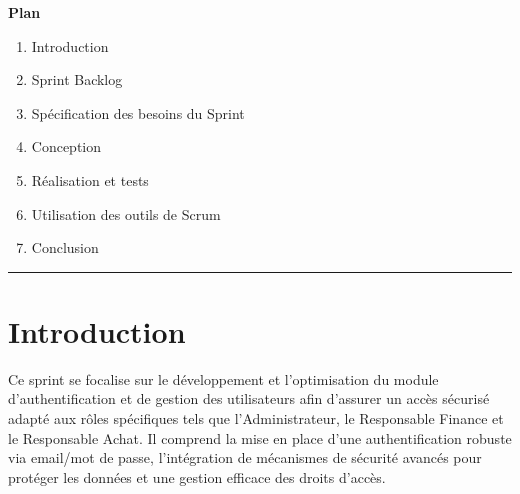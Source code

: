 \documentclass[a4paper,11pt]{report}
\begin{document}
\begin{center}
  {\huge\bfseries Plan}\\[0.5em]
\end{center}
\vspace{1em}

\begin{enumerate}[%
  label=\bfseries\Large\arabic*., 
  leftmargin=2cm, 
  itemsep=1em
]
  \item Introduction
  \item Sprint Backlog
  \item Spécification des besoins du Sprint
  \item Conception
  \item Réalisation et tests
  \item Utilisation des outils de Scrum
  \item Conclusion
\end{enumerate}

\vfill
\begin{center}
  \color{blue!60!black}\rule{0.6\textwidth}{0.8pt}
\end{center}

\newpage
\setcounter{section}{0}

\section{Introduction}

Ce sprint se focalise sur le développement et l’optimisation du module d’authentification et de gestion des utilisateurs afin d’assurer un accès sécurisé adapté aux rôles spécifiques tels que l’Administrateur, le Responsable Finance et le Responsable Achat. Il comprend la mise en place d’une authentification robuste via email/mot de passe, l’intégration de mécanismes de sécurité avancés pour protéger les données et une gestion efficace des droits d’accès.\\
\end{document}
